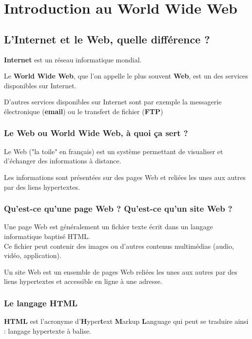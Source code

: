 \documentclass[10pt,dvipsnames, dvips, svgnames]{article}
\begin{document}
\section{Introduction au World Wide Web}
\subsection{L'Internet et le Web, quelle différence ?}


\textbf{Internet} est un réseau informatique mondial.

Le \textbf{World Wide Web}, que l'on appelle le plus souvent \textbf{Web}, est un des services disponibles sur Internet.

D'autres services disponibles sur Internet sont par exemple la messagerie électronique (\textbf{email}) ou le transfert de fichier (\textbf{FTP})

\subsubsection{Le Web ou World Wide Web, à quoi ça sert ?}

Le Web ("la toile" en français) est un système permettant de visualiser et d'échanger des informations à distance.

Les informations sont présentées sur des pages Web et reliées les unes aux autres par des liens hypertextes.
	
\subsubsection{Qu'est-ce qu'une page Web ? Qu'est-ce qu'un site Web ?}

Une page Web est généralement un fichier texte écrit dans un langage informatique baptisé HTML.\\
Ce fichier peut contenir des images ou d'autres contenus multimédias (audio, vidéo, application).

Un site Web est un ensemble de pages Web reliées les unes aux autres par des liens hypertextes et accessible en ligne à une adresse.


\subsubsection{Le langage HTML}

\textbf{HTML} est l'acronyme d'\textbf{H}yper\textbf{t}ext \textbf{M}arkup  \textbf{L}anguage qui peut se traduire ainsi : langage hypertexte à balise.
\end{document}

